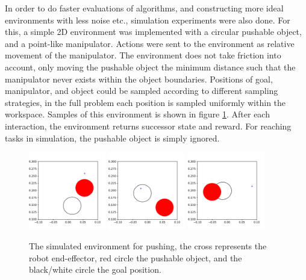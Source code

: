 In order to do faster evaluations of algorithms, and constructing more ideal
environments with less noise etc., simulation experiments were also done. For
this, a simple 2D environment was implemented with a circular pushable object,
and a point-like manipulator. Actions were sent to the environment as relative
movement of the manipulator. The environment does not take friction into
account, only moving the pushable object the minimum distance such that the
manipulator never exists within the object boundaries. Positions of goal,
manipulator, and object could be sampled according to different sampling
strategies, in the full problem each position is sampled uniformly within the
workspace. Samples of this environment is shown in figure
\ref{fig:env_sim_samples}. After each interaction, the environment returns
successor state and reward. For reaching tasks in simulation, the pushable
object is simply ignored.

\begin{figure}[!ht]
    \centering
    \includegraphics[width=0.3\textwidth]{res/env_sim1.pdf}
    \includegraphics[width=0.3\textwidth]{res/env_sim2.pdf}
    \includegraphics[width=0.3\textwidth]{res/env_sim3.pdf}

    \caption{The simulated environment for pushing, the cross represents the
    robot end-effector, red circle the pushable object, and the black/white
    circle the goal position.}

    \label{fig:env_sim_samples}
\end{figure}

